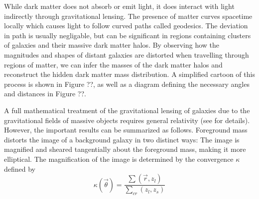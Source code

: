\documentclass[%
 reprint,
 amsmath,amssymb,
 aps,nofootinbib
]{revtex4-1}
\begin{document}
While dark matter does not absorb or emit light, it does interact with light indirectly through gravitational lensing. The presence of matter curves spacetime locally which causes light to follow curved paths called geodesics. The deviation in path is usually negligable, but can be significant in regions containing clusters of galaxies and their massive dark matter halos. By observing how the magnitudes and shapes of distant galaxies are distorted when travelling through regions of matter, we can infer the masses of the dark matter halos and reconstruct the hidden dark matter mass distribution. A simplified cartoon of this process is shown in Figure ??, as well as a diagram defining the necessary angles and distances in Figure ??.


A full mathematical treatment of the gravitational lensing of galaxies due to the gravitational fields of massive objects requires general relativity (see \cite{modern_cosmology} for details). However, the important results can be summarized as follows. Foreground mass distorts the image of a background galaxy in two distinct ways: The image is magnified and sheared tangentially about the foreground mass, making it more elliptical. The magnification of the image is determined by the convergence $\kappa$ defined by
\begin{equation}\label{convergence}
\kappa(\vec{\theta})=\frac{\sum(\vec{r},z_l)}{\sum_{cr}(z_l,z_s)}
\end{equation}
\end{document}

